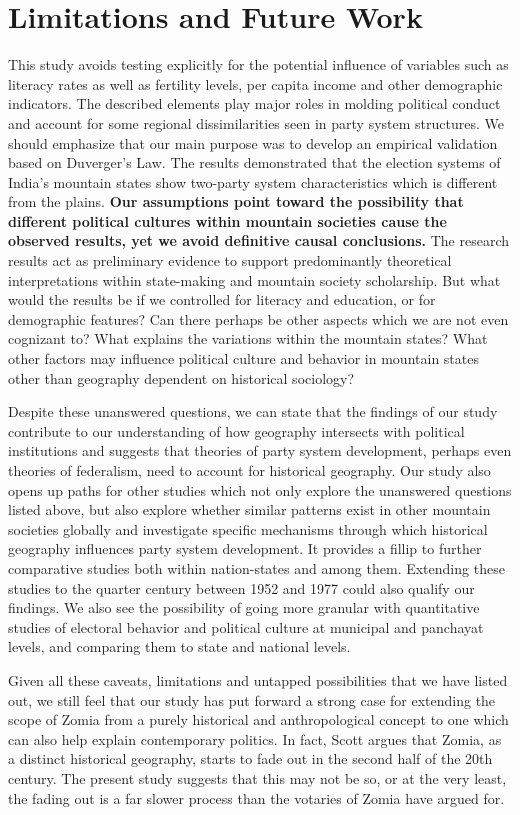 \begin{sloppypar}
\section{Limitations and Future Work}
This study avoids testing explicitly for the potential influence of variables such as literacy rates as well as fertility levels, per capita income and other demographic indicators. The described elements play major roles in molding political conduct and account for some regional dissimilarities seen in party system structures. We should emphasize that our main purpose was to develop an empirical validation based on Duverger's Law. The results demonstrated that the election systems of India's mountain states show two-party system characteristics which is different from the plains. \textbf{Our assumptions point toward the possibility that different political cultures within mountain societies cause the observed results, yet we avoid definitive causal conclusions.} The research results act as preliminary evidence to support predominantly theoretical interpretations within state-making and mountain society scholarship. But what would the results be if we controlled for literacy and education, or for demographic features? Can there perhaps be other aspects which we are not even cognizant to?  What explains the variations within the mountain states? What other factors may influence political culture and behavior in mountain states other than geography dependent on historical sociology?  

Despite these unanswered questions, we can state that the findings of our study contribute to our understanding of how geography intersects with political institutions and suggests that theories of party system development, perhaps even theories of federalism, need to account for historical geography. Our study also opens up paths for other studies which not only explore the unanswered questions listed above, but also explore whether similar patterns exist in other mountain societies globally and investigate specific mechanisms through which historical geography influences party system development. It provides a fillip to further comparative studies both within nation-states and among them. Extending these studies to the quarter century between 1952 and 1977  could also qualify our findings. We also see the possibility of going more granular with quantitative studies of electoral behavior and political culture at municipal and panchayat levels, and comparing them to state and national levels. 

Given all these caveats, limitations and untapped possibilities that we have listed out, we still feel that our study has put forward a strong case for extending the scope of Zomia from a purely historical and anthropological concept to one which can also help explain contemporary politics. In fact, Scott argues that Zomia, as a distinct historical geography, starts to fade out in the second half of the 20th century. The present study suggests that this may not be so, or at the very least, the fading out is a far slower process than the votaries of Zomia have argued for.  


\end{sloppypar}
